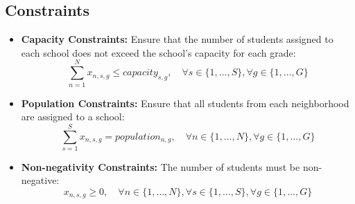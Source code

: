 \documentclass{article}
\begin{document}
\subsection*{Constraints}
\begin{itemize}
    \item \textbf{Capacity Constraints:} Ensure that the number of students assigned to each school does not exceed the school's capacity for each grade:
    \[
    \sum_{n=1}^{N} x_{n,s,g} \leq capacity_{s,g}, \quad \forall s \in \{1, \ldots, S\}, \forall g \in \{1, \ldots, G\}
    \]
    
    \item \textbf{Population Constraints:} Ensure that all students from each neighborhood are assigned to a school:
    \[
    \sum_{s=1}^{S} x_{n,s,g} = population_{n,g}, \quad \forall n \in \{1, \ldots, N\}, \forall g \in \{1, \ldots, G\}
    \]
    
    \item \textbf{Non-negativity Constraints:} The number of students must be non-negative:
    \[
    x_{n,s,g} \geq 0, \quad \forall n \in \{1, \ldots, N\}, \forall s \in \{1, \ldots, S\}, \forall g \in \{1, \ldots, G\}
    \]
\end{itemize}
\end{document}
